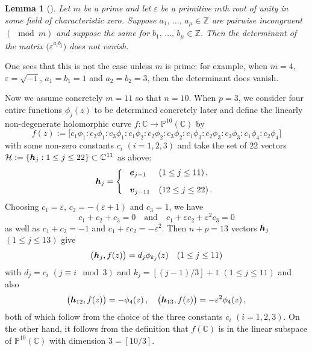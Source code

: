 \documentclass{amsart}
\newtheorem{lemma}[theorem]{Lemma}
\theoremstyle{definition}
\numberwithin{equation}{section}
\numberwithin{theorem}{section}
\begin{document}
\begin{lemma}[\cite{evansi:76}]
Let $m$ be a prime and let $\varepsilon$ be a primitive $m$th root
of unity in some field of characteristic zero. Suppose $a_1,\,
\ldots ,\, a_{\mu}\in\mathbb{Z}$ are pairwise incongruent
$(\!\!\!\mod m)$ and suppose the same for $b_1,\, \ldots ,\,
b_{\mu}\in\mathbb{Z}$. Then the determinant of the matrix
$\big(\varepsilon^{a_ib_j}\big)$ does not vanish.
\end{lemma}

\noindent One sees that this is not the case unless $m$ is prime:
for example, when $m=4$, $\varepsilon=\sqrt{-1}$, $a_1=b_1=1$ and
$a_2=b_2=3$, then the determinant does vanish.

Now we assume concretely $m=11$ so that $n=10$. When $p=3$, we
consider four entire functions $\phi_j(z)$ to be determined
concretely later and define the linearly non-degenerate
holomorphic curve $f:\mathbb{C}\to \mathbb{P}^{10}(\mathbb{C})$ by
$$
f(z):=\bigl[c_1\phi_1:c_2\phi_1:c_3\phi_1:
c_1\phi_2:c_2\phi_2:c_3\phi_2:c_1\phi_3:c_2\phi_3:c_3\phi_3:c_1\phi_4:c_2\phi_4\bigr]
$$
with some non-zero constants $c_i$ $(i=1,2,3)$ and take the set of
$22$ vectors ${\mathcal H}:=\{\mbox{\boldmath$h$}_j : 1\leq j \leq
22\}\subset \mathbb{C}^{11}$ as above:
\[
\mbox{\boldmath$h$}_j= \left\{ \
\begin{array}{ll}
\mbox{\boldmath$e$}_{j-1} & (1\leq j\leq 11)\,, \\[2ex]
\mbox{\boldmath$v$}_{j-11} & (12\leq j \leq 22)\,.
\end{array}
\right.
\]
Choosing $c_1=\varepsilon$, $c_2=-(\varepsilon +1)$
and $c_3=1$, we have
$$
c_1+ c_2+ c_3=0 \quad \text{and} \quad
c_1+\varepsilon c_2 +\varepsilon^2 c_3=0
$$
as well as $c_1+ c_2=-1$ and $c_1+\varepsilon c_2=-\varepsilon^2$.
Then $n+p=13$ vectors
$\mbox{\boldmath$h$}_{j}$ $(1\leq j\leq 13)$ give
$$
\bigl(\mbox{\boldmath$h$}_{j}, f(z)\bigr)=d_j\phi_{k_j}(z) \quad
(1\leq j\leq 11)
$$
with $d_j=c_i$ $(j\equiv i \mod 3)$ and $k_j=[(j-1)/3]+1$ $(1\leq j\leq 11)$
and also
$$
\bigl(\mbox{\boldmath$h$}_{12}, f(z)\bigr)=-\phi_{4}(z)\,,
\quad
\bigl(\mbox{\boldmath$h$}_{13}, f(z)\bigr)=-\varepsilon^2 \phi_{4}(z)\,,
$$
both of which follow from the choice of the three constants $c_i$ $(i=1,2,3)$.
On the other hand, it follows from the definition that
$f(\mathbb{C})$ is in the linear subspace of $\mathbb{P}^{10}(\mathbb{C})$
with dimension $3=[10/3]$.
\end{document}
